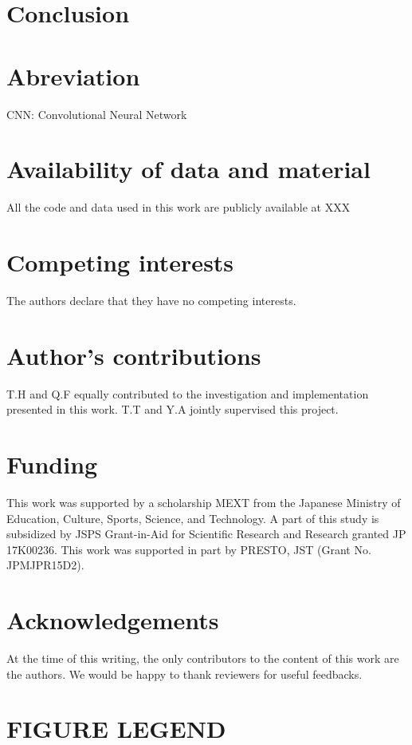 \documentclass[twocolumn]{bmcart}
\def\texttt{[image: ]}
\begin{document}
\section{Conclusion}



\section*{Abreviation}

CNN: Convolutional Neural Network  \\

\begin{backmatter}
\section*{Availability of data and material}
All the code and data used in this work are publicly available at XXX

\section*{Competing interests}
The authors declare that they have no competing interests.

\section*{Author's contributions}
T.H and Q.F equally contributed to the investigation and implementation presented in this work. T.T and Y.A jointly supervised this project.

\section*{Funding}
This work was supported by a scholarship MEXT from the Japanese Ministry of Education, Culture, Sports, Science, and Technology. 
A part of this study is subsidized by JSPS Grant-in-Aid for Scientific Research and Research granted JP 17K00236. 
This work was supported in part by PRESTO, JST (Grant No. JPMJPR15D2).

\section*{Acknowledgements}
At the time of this writing, the only contributors to the content of this work are the authors. We would be happy to thank reviewers for useful feedbacks.




\section*{FIGURE LEGEND}


\end{backmatter}
\end{document}
